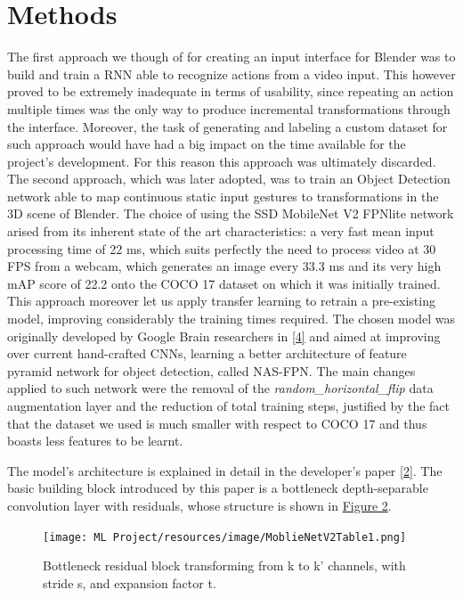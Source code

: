\documentclass[a4paper, 12pt]{article}
\begin{document}
\section{Methods}
\begin{flushleft}
The first approach we though of for creating an input interface for Blender was to build and train a RNN able to recognize actions from a video input. This however proved to be extremely inadequate in terms of usability, since repeating an action multiple times was the only way to produce incremental transformations through the interface. Moreover, the task of generating and labeling a custom dataset for such approach would have had a big impact on the time available for the project's development. For this reason this approach was ultimately discarded.\linebreak
The second approach, which was later adopted, was to train an Object Detection network able to map continuous static input gestures to transformations in the 3D scene of Blender. The choice of using the SSD MobileNet V2 FPNlite network arised from its inherent state of the art characteristics: a very fast mean input processing time of 22 ms, which suits perfectly the need to process video at 30 FPS from a webcam, which generates an image every 33.3 ms and its very high mAP score of 22.2 onto the COCO 17 dataset on which it was initially trained.\linebreak
This approach moreover let us apply transfer learning to retrain a pre-existing model, improving considerably the training times required.
The chosen model was originally developed by Google Brain researchers in \hyperref[Ref1]{[4]} and aimed at improving over current hand-crafted CNNs, learning a better architecture of feature pyramid network for object detection, called NAS-FPN. The main changes applied to such network were the removal of the \textit{random\_horizontal\_flip} data augmentation layer and the reduction of total training steps, justified by the fact that the dataset we used is much smaller with respect to COCO 17 and thus boasts less features to be learnt.\linebreak

The model's architecture is explained in detail in the developer's paper \hyperref[RefArchSSD]{[2]}.
The basic building block introduced by this paper is a bottleneck depth-separable convolution layer with residuals, whose structure is shown in \hyperref[figure2]{Figure 2}.

\begin{figure}[!h]
    \centering
    \texttt{[image: ML Project/resources/image/MoblieNetV2Table1.png]} \caption{Bottleneck residual block transforming from k to k' channels, with stride s, and expansion factor t.}
\end{figure}
\label{figure2}


\end{flushleft}
\end{document}
